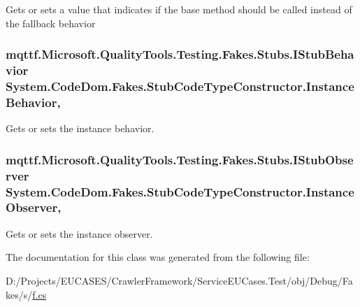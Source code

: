 Gets or sets a value that indicates if the base method should be called instead of the fallback behavior

\hypertarget{class_system_1_1_code_dom_1_1_fakes_1_1_stub_code_type_constructor_a6208442a3a34a2ff245fa5e7a3b64bd0}{
\subsubsection[{Instance\-Behavior}]{\setlength{\rightskip}{0pt plus 5cm}mqttf.\-Microsoft.\-Quality\-Tools.\-Testing.\-Fakes.\-Stubs.\-I\-Stub\-Behavior System.\-Code\-Dom.\-Fakes.\-Stub\-Code\-Type\-Constructor.\-Instance\-Behavior\hspace{0.3cm}{\ttfamily [get]}, {\ttfamily [set]}}}\label{class_system_1_1_code_dom_1_1_fakes_1_1_stub_code_type_constructor_a6208442a3a34a2ff245fa5e7a3b64bd0}


Gets or sets the instance behavior.

\hypertarget{class_system_1_1_code_dom_1_1_fakes_1_1_stub_code_type_constructor_a62fd3382adb6fab7d966700a6801475b}{
\subsubsection[{Instance\-Observer}]{\setlength{\rightskip}{0pt plus 5cm}mqttf.\-Microsoft.\-Quality\-Tools.\-Testing.\-Fakes.\-Stubs.\-I\-Stub\-Observer System.\-Code\-Dom.\-Fakes.\-Stub\-Code\-Type\-Constructor.\-Instance\-Observer\hspace{0.3cm}{\ttfamily [get]}, {\ttfamily [set]}}}\label{class_system_1_1_code_dom_1_1_fakes_1_1_stub_code_type_constructor_a62fd3382adb6fab7d966700a6801475b}


Gets or sets the instance observer.



The documentation for this class was generated from the following file\-:\begin{DoxyCompactItemize}
\item 
D\-:/\-Projects/\-E\-U\-C\-A\-S\-E\-S/\-Crawler\-Framework/\-Service\-E\-U\-Cases.\-Test/obj/\-Debug/\-Fakes/s/\hyperlink{s_2f_8cs}{f.\-cs}\end{DoxyCompactItemize}
